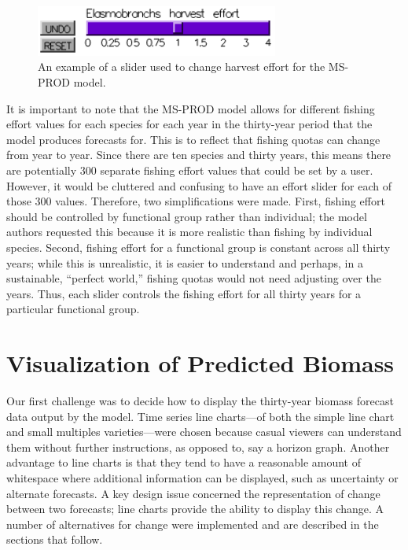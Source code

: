 \begin{figure}[h]
	\centering
	\includegraphics[width=8cm]{figures/png/slider.png}
	\caption[An example of a slider used to change harvest effort for the MS-PROD model]{An example of a slider used to change harvest effort for the MS-PROD model.}
	\label{fig:slider}
\end{figure}

It is important to note that the MS-PROD model allows for different fishing effort values for each species for each year in the thirty-year period that the model produces forecasts for.  This is to reflect that fishing quotas can change from year to year.  Since there are ten species and thirty years, this means there are potentially 300 separate fishing effort values that could be set by a user.  However, it would be cluttered and confusing to have an effort slider for each of those 300 values.  Therefore, two simplifications were made.  First, fishing effort should be controlled by functional group rather than individual; the model authors requested this because it is more realistic than fishing by individual species.  Second, fishing effort for a functional group is constant across all thirty years; while this is unrealistic, it is easier to understand and perhaps, in a sustainable, ``perfect world,'' fishing quotas would not need adjusting over the years.  Thus, each slider controls the fishing effort for all thirty years for a particular functional group.

\section{Visualization of Predicted Biomass}

Our first challenge was to decide how to display the thirty-year biomass forecast data output by the model.  Time series line charts---of both the simple line chart and small multiples varieties---were chosen because casual viewers can understand them without further instructions, as opposed to, say a horizon graph.  Another advantage to line charts is that they tend to have a reasonable amount of whitespace where additional information can be displayed, such as uncertainty or alternate forecasts. A key design issue concerned the representation of change between two forecasts; line charts provide the ability to display this change.  A number of alternatives for change were implemented and are described in the sections that follow.

